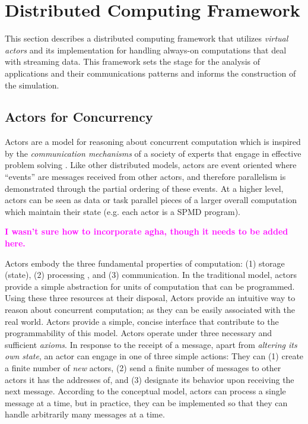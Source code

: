 \documentclass[conference,twocolumn,10pt]{IEEEtran}
\newcommand{\bennote}[1]{\textcolor{magenta}{\bf #1}}
\begin{document}
\section{Distributed Computing Framework}

This section describes a distributed computing framework that utilizes \textit{virtual actors} and its implementation for handling always-on computations that deal with streaming data. This framework sets the stage for the analysis of applications and their communications patterns and informs the construction of the simulation.

\subsection{Actors for Concurrency}

Actors are a model for reasoning about concurrent computation which is inspired by the \textit{communication mechanisms} of a society of experts that engage in effective problem solving \cite{hewitt_viewing_1977}.  Like other distributed models, actors are event oriented where ``events'' are messages received from other actors, and therefore parallelism is demonstrated through the partial ordering of these events. At a higher level, actors can be seen as data or task parallel pieces of a larger overall computation which maintain their state (e.g. each actor is a SPMD program).

\bennote{I wasn't sure how to incorporate agha, though it needs to be added here.}

Actors embody the three fundamental properties of computation: (1) storage (state), (2) processing , and (3) communication. In the traditional model, actors provide a simple abstraction for units of computation that can be programmed. Using these three resources at their disposal, Actors provide an intuitive way to reason about concurrent computation; as they can be easily associated with the real world. Actors provide a simple, concise interface that contribute to the programmability of this model. Actors operate under three necessary and sufficient \textit{axioms}. In response to the receipt of a message, apart from \textit{altering its own state}, an actor can engage in one of three simple actions: They can (1) create a finite number of \textit{new} actors, (2) send a finite number of messages to other actors it has the addresses of, and (3) designate its behavior upon receiving the next message. According to the conceptual model, actors can process a single message at a time, but in practice, they can be implemented so that they can handle arbitrarily many messages at a time. %
\end{document}
